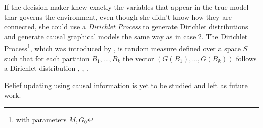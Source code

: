 \documentclass{article}
\begin{document}
If the decision maker knew exactly the variables that appear in the true model thar governs the environment, even though she didn't know how they are connected, she could use a \textit{Dirichlet Process} to generate Dirichlet distributions and generate causal graphical models the same way as in case 2. The Dirichlet Process\footnote{with parameters $M,G_0$}, which was introduced by \cite{ferguson1973bayesian}, is random measure defined over a space $S$ such that for each partition $B_1,...,B_k$ the vector $(G(B_1),...,G(B_k))$ follows a Dirichlet distribution \cite{hjort2010bayesian}, \cite{muller2016bayesian}, \cite{ghosal2017fundamentals}. 

Belief updating using causal information is yet to be studied and left as future work. 


 
 





\end{document}
